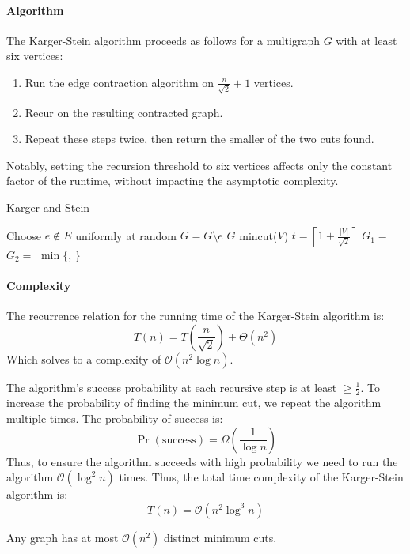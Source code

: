 \paragraph*{Algorithm}
The Karger-Stein algorithm proceeds as follows for a multigraph $G$ with at least six vertices:
\begin{enumerate}
    \item Run the edge contraction algorithm on $\frac{n}{\sqrt{2}}+1$ vertices.
    \item Recur on the resulting contracted graph.
    \item Repeat these steps twice, then return the smaller of the two cuts found.
\end{enumerate}
Notably, setting the recursion threshold to six vertices affects only the constant factor of the runtime, without impacting the asymptotic complexity.
\begin{algorithm}[H]
    \caption{Karger and Stein}
    \begin{algorithmic}[1]
                \State Choose $e\notin E$ uniformly at random
                \State $G=G\setminus e$
            \EndWhile 
            \State \Return $G$
        \EndFunction
        \Statex
                \State \Return mincut($V$)
            \Else 
                \State $t= \left\lceil  1 + \frac{\left\lvert V\right\rvert}{\sqrt{2}}\right\rceil$
                \State $G_1 =$ 
                \State $G_2 =$ 
                \State \Return $\min \{$, $\}$
            \EndIf
        \EndFunction
    \end{algorithmic}
\end{algorithm}  

\paragraph*{Complexity}
The recurrence relation for the running time of the Karger-Stein algorithm is:
\[T(n) = T\left(\frac{n}{\sqrt{2}}\right) + \Theta(n^2)\]
Which solves to a complexity of $\mathcal{O}(n^2 \log n)$.

The algorithm's success probability at each recursive step is at least $\geq \frac{1}{2}$. 
To increase the probability of finding the minimum cut, we repeat the algorithm multiple times.
The probability of success is: 
\[\Pr(\text{success}) = \Omega\left(\dfrac{1}{\log n}\right)\]
Thus, to ensure the algorithm succeeds with high probability we need to run the algorithm $\mathcal{O}(\log^2 n)$ times. 
Thus, the total time complexity of the Karger-Stein algorithm is: 
\[T(n)=\mathcal{O}(n^2 \log^3 n)\]
\begin{corollary}
    Any graph has at most $\mathcal{O}(n^2)$ distinct minimum cuts.
\end{corollary}